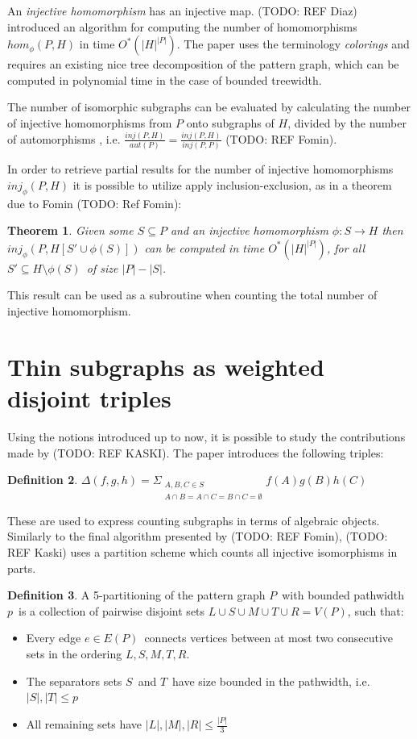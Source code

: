 \documentclass[a4paper,11pt]{report}
\theoremstyle{plain}
\newtheorem{thm}{Theorem}[chapter] %
\theoremstyle{definition}
\newtheorem{defn}[thm]{Definition} %
\begin{document}
An \emph{injective homomorphism} has an injective map.
(TODO: REF Diaz) introduced an algorithm for computing the number of homomorphisms $hom_{\phi}(P, H)$ in time $O^*(|H|^{|P|})$.
The paper uses the terminology \emph{colorings} and requires an existing nice tree decomposition of the pattern graph, which can be computed in polynomial time in the case of bounded treewidth.

The number of isomorphic subgraphs can be evaluated by calculating the number of injective homomorphisms from $P$ onto subgraphs of $H$, divided by the number of automorphisms
, i.e. $\frac{inj(P, H)}{aut(P)} = \frac{inj(P, H)}{inj(P, P)}$ (TODO: REF Fomin).

In order to retrieve partial results for the number of injective homomorphisms $inj_{\phi}(P, H)$ it is possible to utilize apply inclusion-exclusion, as in a theorem due to Fomin (TODO: Ref Fomin):

\begin{thm}
\label{thm:fomin}
Given some $S \subseteq P$ and an injective homomorphism $\phi : S \rightarrow H$ then $inj_{\phi}(P, H[S' \cup \phi(S)])$ can be computed in time $O^*(|H|^{|P|})$, for all $S' \subseteq H \setminus \phi(S)$ of size $|P| - |S|$.
\end{thm}


This result can be used as a subroutine when counting the total number of injective homomorphism.

\section{Thin subgraphs as weighted disjoint triples}
Using the notions introduced up to now, it is possible to study the contributions made by (TODO: REF KASKI).
The paper introduces the following triples:

\begin{defn}
$\Delta(f, g, h) = \Sigma_{\substack{A, B, C \in S\\A \cap B = A \cap C = B \cap C = \emptyset}} f(A)g(B)h(C)$
\end{defn}

These are used to express counting subgraphs in terms of algebraic objects.
Similarly to the final algorithm presented by (TODO: REF Fomin), (TODO: REF Kaski) uses a partition scheme which counts all injective isomorphisms in parts.

\begin{defn}
A 5-partitioning of the pattern graph $P$ with bounded pathwidth $p$ is a collection of pairwise disjoint sets $L \cup S \cup M \cup T \cup R = V(P)$, such that:
\begin{itemize}
\item Every edge $e \in E(P)$ connects vertices between at most two consecutive sets in the ordering $L, S, M, T, R$.
\item The separators sets $S$ and $T$ have size bounded in the pathwidth, i.e. $|S|, |T| \leq p$
\item All remaining sets have $|L|, |M|, |R| \leq \frac{|P|}{3}$
\end{itemize}
\end{defn}
\end{document}
